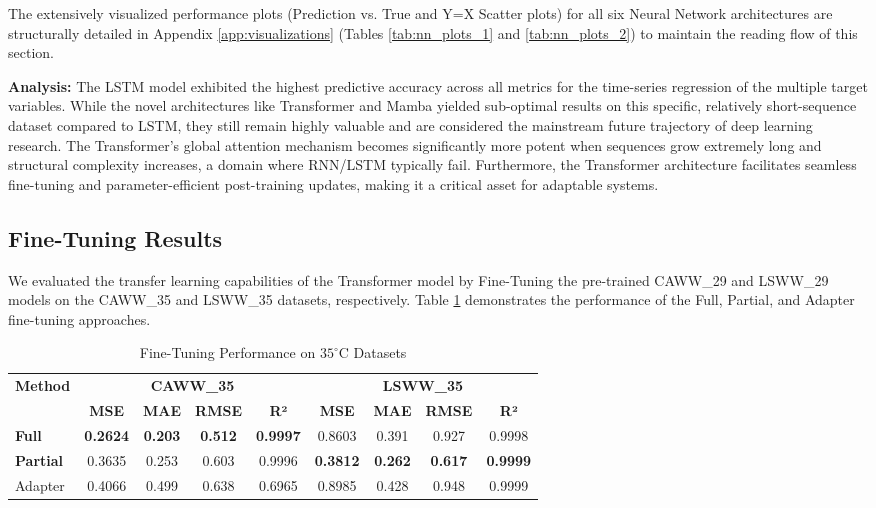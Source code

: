 \documentclass[a4paper]{article}
\begin{document}
The extensively visualized performance plots (Prediction vs. True and Y=X Scatter plots) for all six Neural Network architectures are structurally detailed in Appendix \ref{app:visualizations} (Tables \ref{tab:nn_plots_1} and \ref{tab:nn_plots_2}) to maintain the reading flow of this section.

\textbf{Analysis:} The LSTM model exhibited the highest predictive accuracy across all metrics for the time-series regression of the multiple target variables. While the novel architectures like Transformer and Mamba yielded sub-optimal results on this specific, relatively short-sequence dataset compared to LSTM, they still remain highly valuable and are considered the mainstream future trajectory of deep learning research. The Transformer's global attention mechanism becomes significantly more potent when sequences grow extremely long and structural complexity increases, a domain where RNN/LSTM typically fail. Furthermore, the Transformer architecture facilitates seamless fine-tuning and parameter-efficient post-training updates, making it a critical asset for adaptable systems.

\subsection{Fine-Tuning Results}

We evaluated the transfer learning capabilities of the Transformer model by Fine-Tuning the pre-trained CAWW\_29 and LSWW\_29 models on the CAWW\_35 and LSWW\_35 datasets, respectively. Table \ref{tab:finetune_metrics} demonstrates the performance of the Full, Partial, and Adapter fine-tuning approaches.

\begin{table}[h!]
\centering
\caption{Fine-Tuning Performance on $35^{\circ}\text{C}$ Datasets}
\label{tab:finetune_metrics}
\begin{tabular}{l|cccc|cccc}
\toprule
\textbf{Method} & \multicolumn{4}{c|}{\textbf{CAWW\_35}} & \multicolumn{4}{c}{\textbf{LSWW\_35}} \\
& \textbf{MSE} & \textbf{MAE} & \textbf{RMSE} & \textbf{R²} & \textbf{MSE} & \textbf{MAE} & \textbf{RMSE} & \textbf{R²} \\
\midrule
\textbf{Full} & \textbf{0.2624} & \textbf{0.203} & \textbf{0.512} & \textbf{0.9997} & 0.8603 & 0.391 & 0.927 & 0.9998 \\
\textbf{Partial} & 0.3635 & 0.253 & 0.603 & 0.9996 & \textbf{0.3812} & \textbf{0.262} & \textbf{0.617} & \textbf{0.9999} \\
Adapter & 0.4066 & 0.499 & 0.638 & 0.6965 & 0.8985 & 0.428 & 0.948 & 0.9999 \\
\bottomrule
\end{tabular}
\end{table}
\end{document}
